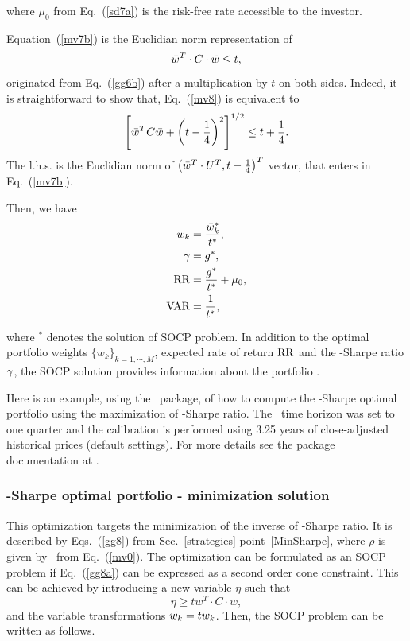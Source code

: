 \noindent where $\mu_0$ from Eq.~(\ref{sd7a}) is the risk-free rate accessible to the investor.

Equation~(\ref{mv7b}) is the Euclidian norm representation of
\begin{equation}
    \bw^T \cdot C \cdot \bw \leq t,
    \label{mv8}
\end{equation}
originated from Eq.~(\ref{gg6b}) after a multiplication by $t$ on both sides. Indeed, it is straightforward to show
that, Eq.~(\ref{mv8}) is equivalent to
\begin{equation}
    \left[ \bw^T C \bw +\left(t - \frac{1}{4}\right)^2 \right]^{1/2} \leq t + \frac{1}{4}.
    \label{mv9}
\end{equation}
The l.h.s. is the Euclidian norm of $\left({\bar w}^T \cdot U^T , t - \frac{1}{4} \right)^T$ vector, that enters
in Eq.~(\ref{mv7b}).


Then, we have
\begin{subequations}\label{mv10}
\begin{align}
    w_k &= \frac{\bw_k^*}{t^*} , \label{mv10a} \\
    \Sharpe &= g^*, \label{mv10b} \\
    \RR &= \frac{g^*}{t^*} + \mu_0, \label{mv10c} \\
    \VAR &= \frac{1}{t^*}, \label{mv10d}
\end{align}
\end{subequations}

\noindent where $^*$ denotes the solution of SOCP problem.
In addition to the optimal portfolio weights $\{w_k\}_{k=1,\cdots,M}$, expected rate of return ${\rm RR}$ and
the \MV-Sharpe ratio ${\gamma}$,
the SOCP solution provides information about the portfolio \VAR.


\bigskip
\noindent Here is an example, using the \azapy\ package, of how to compute the \MV-Sharpe optimal portfolio using the maximization
of \MV-Sharpe ratio.
The \VAR\ time horizon was set to one quarter and the calibration is performed using 3.25 years of
close-adjusted historical prices (default settings).
For more details see the package documentation at \azapydoc.



\BackToContents

\subsubsection{\MV-Sharpe optimal portfolio - minimization solution}
This optimization targets the minimization of the inverse of \MV-Sharpe ratio.
It is described by Eqs.~(\ref{gg8}) from Sec.~\ref{strategies} point~\ref{MinSharpe}, where
$\rho$ is given by \VAR\ from Eq.~(\ref{mv0}).
The optimization can be formulated as an SOCP problem if Eq.~(\ref{gg8a}) can be expressed as a second order cone constraint. This can be achieved by
introducing a new variable $\eta$ such that
\begin{equation}
    \eta \geq t w^T \cdot C \cdot w,
    \label{mv11}
\end{equation}
and the variable transformations ${\bar w}_k = t w_k$.
Then, the SOCP problem can be written as follows.

